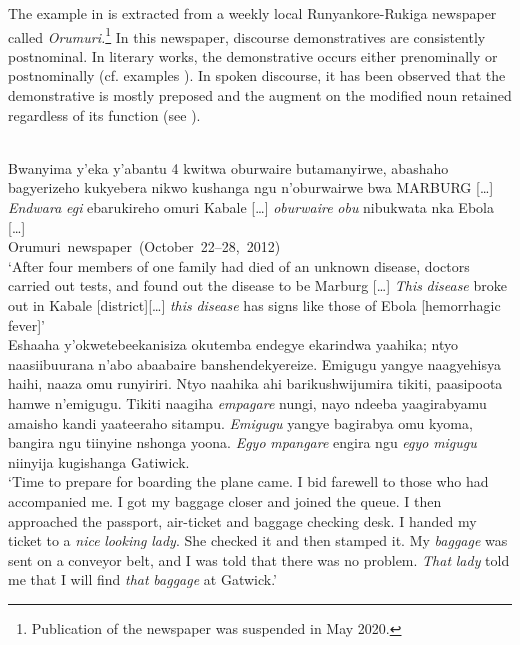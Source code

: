 \documentclass[output=paper 		  ]{langscibook}
\begin{document}
The example in  is extracted from a weekly local Run\-yan\-ko\-re-Ru\-ki\-ga newspaper called \textit{Orumuri.}\footnote{Publication of the newspaper was suspended in May 2020.} In this newspaper, discourse demonstratives are consistently postnominal. In literary works, the demonstrative occurs either prenominally or postnominally (cf. examples ). In spoken discourse, it has been observed that the demonstrative is mostly preposed and the augment on the modified noun retained regardless of its function (see ).

\eanoraggedright%
\label{ex:asiimwe:33} \citet[197]{Asiimwe2014}\\\sloppy
    Bwanyima y’eka y’abantu 4 kwitwa oburwaire butamanyirwe, abashaho bagyerizeho kukyebera nikwo kushanga ngu n’oburwairwe bwa MARBURG […] \emph{Endwara} \emph{egi} ebarukireho omuri Kabale […] \emph{oburwaire} \emph{obu} nibukwata nka Ebola […] \\
    \hfill \hbox{Orumuri newspaper (October 22--28, 2012)}\\
  ‘After four members of one family had died of an unknown disease, doctors carried out tests, and found out the disease to be Marburg […] \emph{This} \emph{disease} broke out in Kabale [district][…] \emph{this} \emph{disease} has signs like those of Ebola [hemorrhagic fever]’
\ex%
    \label{ex:asiimwe:34} \citet[207]{Asiimwe2014}\\
    Eshaaha y’okwetebeekanisiza okutemba endegye ekarindwa yaahika; ntyo naasiibuurana n’abo abaabaire banshendekyereize. Emigugu yangye naagyehisya haihi, naaza omu runyiriri. Ntyo naahika ahi barikushwijumira tikiti, paasipoota hamwe n’emigugu. Tikiti naagiha \emph{empagare} nungi, nayo ndeeba yaagirabyamu amaisho kandi yaateeraho sitampu. \emph{Emigugu} yangye bagirabya omu kyoma, bangira ngu tiinyine nshonga yoona. \emph{Egyo} \emph{mpangare} engira ngu \emph{egyo} \emph{migugu} niinyija kugishanga Gatiwick. \hfill \hbox{\citep[1]{Mugumya2010}}\\
‘Time to prepare for boarding the plane came. I bid farewell to those who had accompanied me. I got my baggage closer and joined the queue. I then approached the passport, air-ticket and baggage checking desk. I handed my ticket to a \emph{nice} \emph{looking} \emph{lady}. She checked it and then stamped it. My \emph{baggage} was sent on a conveyor belt, and I was told that there was no problem. \emph{That} \emph{lady} told me that I will find \emph{that} \emph{baggage} at Gatwick.’
\z
\end{document}
